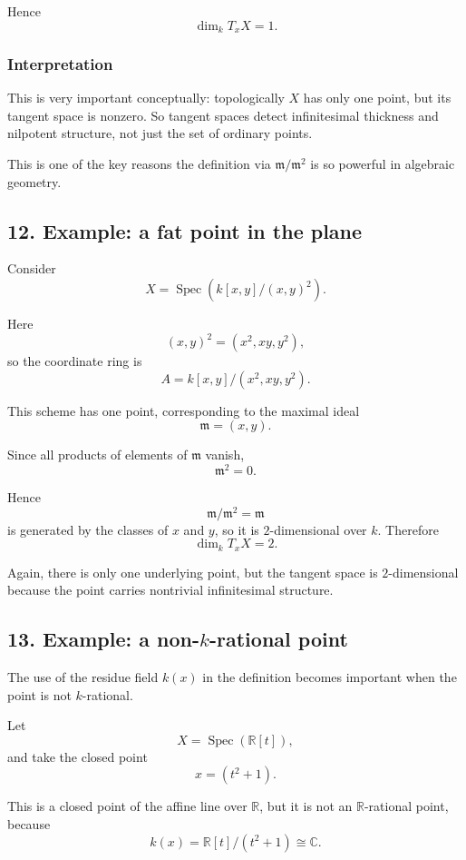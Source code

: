\documentclass[12pt,a4paper]{article}
\theoremstyle{plain}
\theoremstyle{definition}      %
\begin{document}
	Hence
	\[
	\dim_k T_xX=1.
	\]
	
	\subsubsection*{Interpretation}
	
	This is very important conceptually: topologically \(X\) has only one point, but its tangent space is nonzero. So tangent spaces detect infinitesimal thickness and nilpotent structure, not just the set of ordinary points.
	
	This is one of the key reasons the definition via \(\mathfrak m/\mathfrak m^2\) is so powerful in algebraic geometry.
	
	\subsection*{12. Example: a fat point in the plane}
	
	Consider
	\[
	X=\operatorname{Spec}(k[x,y]/(x,y)^2).
	\]
	
	Here
	\[
	(x,y)^2=(x^2,xy,y^2),
	\]
	so the coordinate ring is
	\[
	A=k[x,y]/(x^2,xy,y^2).
	\]
	
	This scheme has one point, corresponding to the maximal ideal
	\[
	\mathfrak m=(x,y).
	\]
	
	Since all products of elements of \(\mathfrak m\) vanish,
	\[
	\mathfrak m^2=0.
	\]
	
	Hence
	\[
	\mathfrak m/\mathfrak m^2=\mathfrak m
	\]
	is generated by the classes of \(x\) and \(y\), so it is \(2\)-dimensional over \(k\). Therefore
	\[
	\dim_k T_xX=2.
	\]
	
	Again, there is only one underlying point, but the tangent space is \(2\)-dimensional because the point carries nontrivial infinitesimal structure.
	
	\subsection*{13. Example: a non-\(k\)-rational point}
	
	The use of the residue field \(k(x)\) in the definition becomes important when the point is not \(k\)-rational.
	
	Let
	\[
	X=\operatorname{Spec}(\mathbb R[t]),
	\]
	and take the closed point
	\[
	x=(t^2+1).
	\]
	
	This is a closed point of the affine line over \(\mathbb R\), but it is not an \(\mathbb R\)-rational point, because
	\[
	k(x)=\mathbb R[t]/(t^2+1)\cong \mathbb C.
	\]
	
\end{document}
